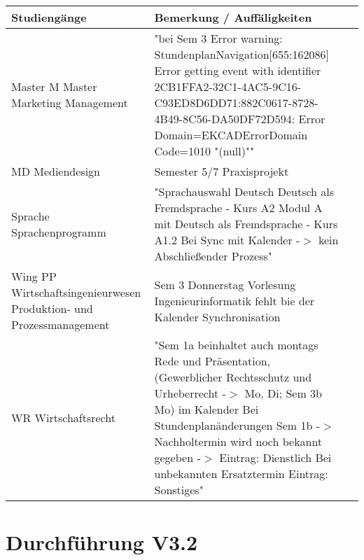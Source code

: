 \noindent%
\begin{tabularx}{\textwidth}{|p{}|X|X| }
\hline
\textbf{Studiengänge} &\textbf{Bemerkung / Auffäligkeiten}   \\ \hline 

Master M  Master Marketing Management &
"bei Sem 3 Error warning:
StundenplanNavigation[655:162086] Error getting event with identifier 2CB1FFA2-32C1-4AC5-9C16-C93ED8D6DD71:882C0617-8728-4B49-8C56-DA50DF72D594: Error Domain=EKCADErrorDomain Code=1010 "(null)""   \\ \hline
MD  Mediendesign & Semester 5/7 Praxisprojekt  \\ \hline

Sprache  Sprachenprogramm & 
"Sprachauswahl Deutsch
Deutsch als Fremdsprache - Kurs A2 Modul A mit Deutsch als Fremdsprache - Kurs A1.2 Bei Sync mit Kalender -$>$ kein Abschließender Prozess"   \\ \hline
Wing PP Wirtschaftsingenieurwesen Produktion- und Prozessmanagement & 
Sem 3  Donnerstag Vorlesung Ingenieurinformatik fehlt bie der Kalender Synchronisation  \\ \hline
WR  Wirtschaftsrecht & 
"Sem 1a beinhaltet auch montags Rede und Präsentation, (Gewerblicher Rechtsschutz und Urheberrecht -$>$ Mo, Di; Sem 3b Mo) im Kalender
Bei Stundenplanänderungen Sem 1b -$>$ Nachholtermin wird noch bekannt gegeben -$>$ Eintrag: Dienstlich
Bei unbekannten Ersatztermin Eintrag: Sonstiges"   \\ \hline
\end{tabularx}
 \newline


\section{Durchführung V3.2}
